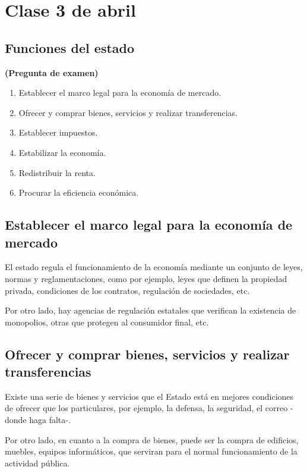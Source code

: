 \section{Clase 3 de abril}

\subsection{Funciones del estado}

\textbf{(Pregunta de examen)}

\begin{enumerate}
    \item Establecer el marco legal para la economía de mercado.
    \item Ofrecer y comprar bienes, servicios y realizar transferencias.
    \item Establecer impuestos.
    \item Estabilizar la economía.
    \item Redistribuir la renta.
    \item Procurar la eficiencia económica.
\end{enumerate}

\subsection{Establecer el marco legal para la economía de mercado}

El estado regula el funcionamiento de la economía mediante un conjunto de leyes,
normas y reglamentaciones, como por ejemplo, leyes que definen la propiedad privada,
condiciones de los contratos, regulación de sociedades, etc.

Por otro lado, hay agencias de regulación estatales que verifican la existencia de monopolios,
otras que protegen al consumidor final, etc.

\subsection{Ofrecer y comprar bienes, servicios y realizar transferencias}

Existe una serie de bienes y servicios que el Estado está en mejores condiciones de ofrecer que los particulares,
por ejemplo, la defensa, la seguridad, el correo -donde haga falta-.

Por otro lado, en cuanto a la compra de bienes,
puede ser la compra de edificios,
muebles, equipos informáticos,
que serviran para el normal funcionamiento de la actividad pública.

